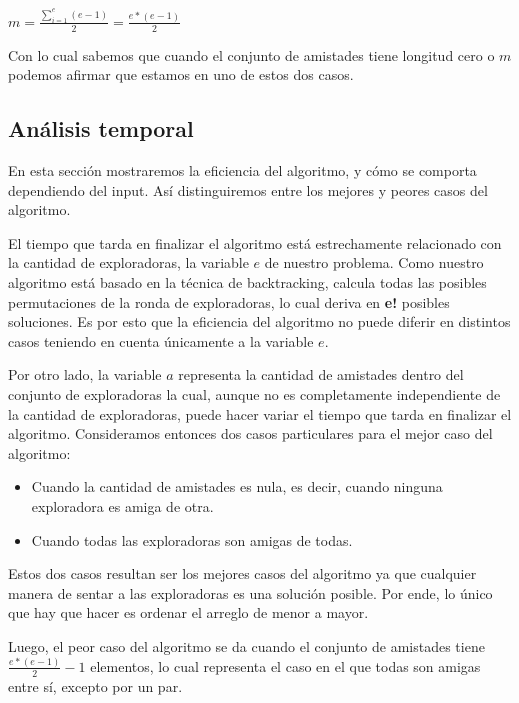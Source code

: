 \documentclass[11pt]{article}
\begin{document}
\begin{center}
$m = \frac{\sum\limits_{i=1}^e (e-1)}{2} = \frac{e*(e-1)}{2}$
\end{center}

\vspace{3mm}

Con lo cual sabemos que cuando el conjunto de amistades tiene longitud cero o $m$ podemos afirmar que estamos 
en uno de estos dos casos.



\subsection{Análisis temporal}

En esta sección mostraremos la eficiencia del algoritmo, y cómo se comporta dependiendo del input. Así distinguiremos 
entre los mejores y peores casos del algoritmo.

El tiempo que tarda en finalizar el algoritmo está estrechamente relacionado con la cantidad de exploradoras, la variable $e$ de nuestro problema. Como nuestro algoritmo está basado en la técnica de backtracking, 
calcula todas las posibles permutaciones de la ronda de exploradoras, lo cual deriva en \textbf{e!} posibles soluciones.
Es por esto que la eficiencia del algoritmo no puede diferir en distintos casos teniendo en cuenta únicamente 
a la variable $e$.

Por otro lado, la variable $a$ representa la cantidad de amistades dentro del conjunto de exploradoras la cual, 
aunque no es completamente independiente de la cantidad de exploradoras, puede hacer variar el tiempo que tarda 
en finalizar el algoritmo. Consideramos entonces dos casos particulares para el mejor caso del algoritmo:
\begin{itemize}
  \item Cuando la cantidad de amistades es nula, es decir, cuando ninguna exploradora es amiga de otra.
  \item Cuando todas las exploradoras son amigas de todas.
\end{itemize}
Estos dos casos resultan ser los mejores casos del algoritmo ya que cualquier manera de sentar a las exploradoras 
es una solución posible. Por ende, lo único que hay que hacer es ordenar el arreglo de menor a mayor. 

Luego, el peor caso del algoritmo se da cuando el conjunto de amistades tiene $\frac{e*(e-1)}{2} - 1$ elementos, 
lo cual representa el caso en el que todas son amigas entre sí, excepto por un par.
\end{document}
